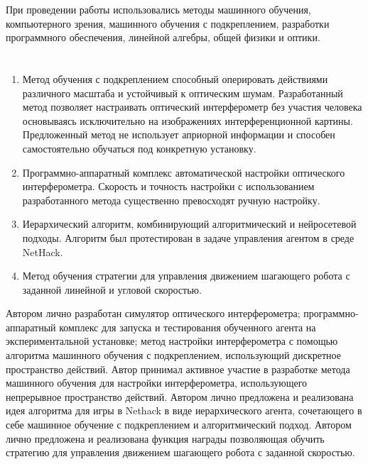 {\methods} При проведении работы использовались методы машинного обучения, компьютерного зрения, машинного обучения с подкреплением, разработки программного обеспечения, линейной алгебры, общей физики и оптики. 

\ifresume
\section*{}
\fi

{}
\begin{enumerate}[beginpenalty=10000] %
  \item Метод обучения с подкреплением способный оперировать действиями различного масштаба и устойчивый к оптическим шумам. Разработанный метод позволяет настраивать оптический интерферометр без участия человека основываясь исключительно на изображениях интерференционной картины. Предложенный метод не использует априорной информации и способен самостоятельно обучаться под конкретную установку.
  \item Программно-аппаратный комплекс автоматической настройки оптического интерферометра. Скорость и точность настройки с использованием разработанного метода существенно превосходят ручную настройку. 
  \item Иерархический алгоритм, комбинирующий алгоритмический и нейросетевой подходы. Алгоритм был протестирован в задаче управления агентом в среде NetHack.
  \item Метод обучения стратегии для управления движением шагающего робота с заданной линейной и угловой скоростью.
\end{enumerate}

{\contribution} Автором лично разработан симулятор оптического интерферометра; программно-аппаратный комплекс для запуска и тестирования обученного агента на экспериментальной установке; метод настройки интерферометра с помощью алгоритма машинного обучения с подкреплением, использующий дискретное пространство действий. Автор принимал активное участие в разработке метода машинного обучения для настройки интерферометра, использующего непрерывное пространство действий. Автором лично предложена и реализована идея алгоритма для игры в Nethack в виде иерархического агента, сочетающего в себе машинное обучение с подкреплением и алгоритмический подход. Автором лично предложена и реализована функция награды позволяющая обучить стратегию для управления движением шагающего робота с заданной скоростью. 


